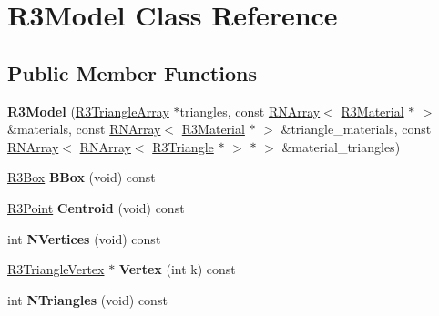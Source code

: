\hypertarget{class_r3_model}{}\section{R3\+Model Class Reference}
\label{class_r3_model}
\subsection*{Public Member Functions}
\begin{DoxyCompactItemize}
\item 
{\bfseries R3\+Model} (\hyperlink{class_r3_triangle_array}{R3\+Triangle\+Array} $\ast$triangles, const \hyperlink{class_r_n_array}{R\+N\+Array}$<$ \hyperlink{class_r3_material}{R3\+Material} $\ast$ $>$ \&materials, const \hyperlink{class_r_n_array}{R\+N\+Array}$<$ \hyperlink{class_r3_material}{R3\+Material} $\ast$ $>$ \&triangle\+\_\+materials, const \hyperlink{class_r_n_array}{R\+N\+Array}$<$ \hyperlink{class_r_n_array}{R\+N\+Array}$<$ \hyperlink{class_r3_triangle}{R3\+Triangle} $\ast$ $>$ $\ast$ $>$ \&material\+\_\+triangles)\hypertarget{class_r3_model_abea150858ccf81e2655e73589209c91a}{}\label{class_r3_model_abea150858ccf81e2655e73589209c91a}

\item 
\hyperlink{class_r3_box}{R3\+Box} {\bfseries B\+Box} (void) const \hypertarget{class_r3_model_a6e108beed66d3eb7a142af9d3460de00}{}\label{class_r3_model_a6e108beed66d3eb7a142af9d3460de00}

\item 
\hyperlink{class_r3_point}{R3\+Point} {\bfseries Centroid} (void) const \hypertarget{class_r3_model_ac4e96731fe528309a88b0e573884b434}{}\label{class_r3_model_ac4e96731fe528309a88b0e573884b434}

\item 
int {\bfseries N\+Vertices} (void) const \hypertarget{class_r3_model_a4eba4dcc6b2be06d36404d9f3597ac44}{}\label{class_r3_model_a4eba4dcc6b2be06d36404d9f3597ac44}

\item 
\hyperlink{class_r3_triangle_vertex}{R3\+Triangle\+Vertex} $\ast$ {\bfseries Vertex} (int k) const \hypertarget{class_r3_model_afe11cc852a96671bc1d1fb45f13c4c15}{}\label{class_r3_model_afe11cc852a96671bc1d1fb45f13c4c15}

\item 
int {\bfseries N\+Triangles} (void) const \hypertarget{class_r3_model_acaf55cbf171d8fae02d269d3d85619e2}{}\label{class_r3_model_acaf55cbf171d8fae02d269d3d85619e2}


\end{DoxyCompactItemize}
